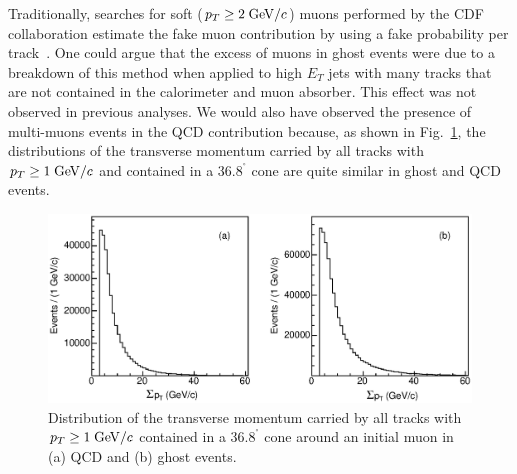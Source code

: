 \documentclass[aps,prd,preprint,floatfix,nofootinbib,superscriptaddress,showpacs,amssymb]{revtex4}
\def\deg{^\circ}
\begin{document}
 Traditionally, searches for soft ($p_T\geq 2 \; {\rm GeV/}c$) muons performed 
 by the CDF collaboration estimate the fake muon contribution by using a
 fake probability per track~\cite{topev}. One could argue that the excess of
 muons in ghost events were due to a breakdown of this method when applied
 to high $E_T$ jets with many tracks that are not contained in the 
 calorimeter and muon absorber. This effect was not observed in previous
 analyses. We would also have observed the presence of multi-muons events
 in the QCD contribution because, as shown in Fig.~\ref{fig:fig_sumpt},
 the distributions of the transverse momentum carried by all tracks with
 $p_T \geq 1 \; {\rm GeV/}c$ and contained in a $36.8^{\deg}$ cone 
 are quite similar in ghost and QCD events.  
 \begin{figure}[]
 \begin{center}
 \vspace{-0.2in}
 \leavevmode
 \includegraphics*[width=\textwidth]{fa0_Ptcone.eps}
 \caption[]{Distribution of the transverse momentum carried by all tracks
            with $p_T \geq 1 \; {\rm GeV/}c$ contained in a $36.8^{\deg}$ cone 
            around an initial muon in (a) QCD and (b) ghost events.}
 \label{fig:fig_sumpt}
 \end{center}
 \end{figure}
\end{document}
